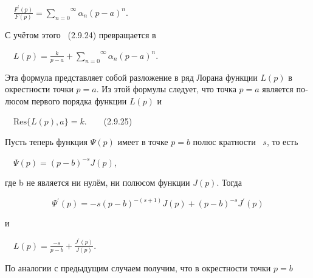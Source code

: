 \documentclass[a4paper]{article}
\begin{document}
{\begin{russian}\sffamily
\ \  $\frac{F^'(p)}{F(p)}=\overset{\infty }{\underset{n=0}{\sum }}α_n(p-a)^n$.
\end{russian}}

{\begin{russian}\sffamily
С учётом этого \ (2.9.24) превращается в 
\end{russian}}

{\begin{russian}\sffamily
\ \  $L(p)=\frac k{p-a}+\overset{\infty }{\underset{n=0}{\sum }}α_n(p-a)^n$.\ \ 
\end{russian}}

{\begin{russian}\sffamily
Эта формула представляет собой разложение в ряд Лорана функции  $L(p)$ в окрестности точки  $p=a$. Из этой формулы
следует, что точка  $p=a$ является полюсом первого порядка функции  $L(p)$ и 
\end{russian}}

{\begin{russian}\sffamily
\ \  $\text{Res}\{L(p),a\}=k$.\ \ \ \ (2.9.25)
\end{russian}}

{\begin{russian}\sffamily
Пусть теперь функция  $Ψ(p)$ имеет в точке  $p=b$ полюс кратности \  $s$, то есть
\end{russian}}

{\begin{russian}\sffamily
\ \  $Ψ(p)=(p-b)^{-s}J(p)$,
\end{russian}}

{\begin{russian}\sffamily
где \textenglish{b} не является ни нулём, ни полюсом функции  $J(p)$. Тогда 
\end{russian}}

\begin{equation*}
Ψ^'(p)=-s(p-b)^{-(s+1)}J(p)+(p-b)^{-s}J^'(p)
\end{equation*}
{\begin{russian}\sffamily
и
\end{russian}}

{\begin{russian}\sffamily
\ \  $L(p)=\frac{-s}{p-b}+\frac{J^'(p)}{J(p)}$.
\end{russian}}

{\begin{russian}\sffamily
По аналогии с предыдущим случаем получим, что в окрестности точки  $p=b$
\end{russian}}
\end{document}
